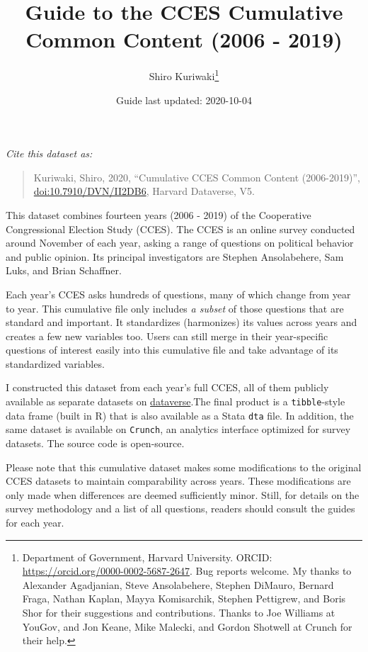 \documentclass[10pt,article,oneside]{memoir}
\title{ \LARGE\textbf{Guide to the CCES Cumulative Common Content (2006
- 2019)}}
\author{Shiro Kuriwaki\thanks{Department of Government, Harvard
University. ORCID: \url{https://orcid.org/0000-0002-5687-2647}. Bug
reports welcome. My thanks to Alexander Agadjanian, Steve Ansolabehere,
Stephen DiMauro, Bernard Fraga, Nathan Kaplan, Mayya Komisarchik,
Stephen Pettigrew, and Boris Shor for their suggestions and
contributions. Thanks to Joe Williams at YouGov, and Jon Keane, Mike
Malecki, and Gordon Shotwell at Crunch for their help.}  }
\date{Guide last updated: 2020-10-04}
\theoremstyle{definition}
\begin{document}
\maketitle





\renewcommand\UrlFont{\color{crimson}\ttfamily}

\noindent \emph{Cite this dataset as:}

\begin{quote}
Kuriwaki, Shiro, 2020, ``Cumulative CCES Common Content (2006-2019)'',
\href{https://dataverse.harvard.edu/dataset.xhtml?persistentId=doi:10.7910/DVN/II2DB6}{\url{doi:10.7910/DVN/II2DB6}},
Harvard Dataverse, V5.
\end{quote}

\bigskip

This dataset combines fourteen years (2006 - 2019) of the Cooperative
Congressional Election Study (CCES). The CCES is an online survey
conducted around November of each year, asking a range of questions on
political behavior and public opinion. Its principal investigators are
Stephen Ansolabehere, Sam Luks, and Brian Schaffner.

\bigskip

Each year's CCES asks hundreds of questions, many of which change from
year to year. This cumulative file only includes \emph{a subset} of
those questions that are standard and important. It standardizes
(harmonizes) its values across years and creates a few new variables
too. Users can still merge in their year-specific questions of interest
easily into this cumulative file and take advantage of its standardized
variables.

\bigskip

I constructed this dataset from each year's full CCES, all of them
publicly available as separate datasets on
\href{cces.gov.harvard.edu}{dataverse}.The final product is a
\texttt{tibble}-style data frame (built in R) that is also available as
a Stata \texttt{dta} file. In addition, the same dataset is available on
\texttt{Crunch}, an analytics interface optimized for survey datasets.
The source code is open-source.

\bigskip

Please note that this cumulative dataset makes some modifications to the
original CCES datasets to maintain comparability across years. These
modifications are only made when differences are deemed sufficiently
minor. Still, for details on the survey methodology and a list of all
questions, readers should consult the guides for each year.
\end{document}
